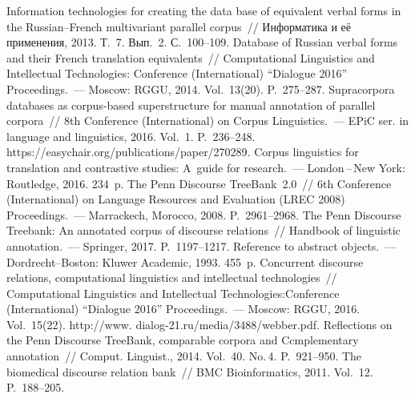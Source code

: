 \begin{multicols}{2}
{\small\frenchspacing
{%
\begin{thebibliography}{99}
Information technologies for creating the data base of equivalent verbal forms in the 
Russian--French multivariant parallel corpus~// Информатика и её применения, 
2013. Т.~7. Вып.~2. С.~100--109.
   Database of Russian verbal forms and their French 
translation equivalents~// Computational Linguistics and Intellectual Technologies:  
Conference (International) ``Dialogue 2016'' Proceedings.~--- Moscow: RGGU, 
2014. Vol.~13(20). P.~275--287.
   Supracorpora databases as corpus-based superstructure for 
manual annotation of parallel corpora~// 8th Conference (International) 
on Corpus Linguistics.~--- EPiC ser. in language and linguistics, 2016. Vol.~1. 
P.~236--248. {\sf https://easychair.org/publications/paper/270289}.
   Corpus linguistics for translation and contrastive 
studies: A~guide for research.~--- London\,--\,New York: Routledge, 2016. 234~p.
   The Penn Discourse TreeBank~2.0~//  6th Conference (International) on 
Language Resources and Evaluation (LREC 2008) Proceedings.~--- Marrackech, 
Morocco, 2008.  P.~2961--2968.
   The Penn Discourse Treebank: An 
annotated corpus of discourse relations~// Handbook of linguistic annotation.~--- 
Springer, 2017. P.~1197--1217.
   Reference to abstract objects.~--- Dordrecht--Boston: Kluwer 
Academic, 1993. 455~p.
   Concurrent discourse relations, computational linguistics and 
intellectual technologies~// Com\-pu\-tational 
Linguistics and Intellectual Technologies:\linebreak Conference (International) ``Dialogue 2016'' 
Pro\-ceed\-ings.~--- Moscow: RGGU, 2016. Vol.~15(22). {\sf 
http://www. dialog-21.ru/media/3488/webber.pdf}.
   Reflections on the Penn Discourse 
TreeBank, comparable corpora and Ccmplementary annotation~// Comput. 
Linguist., 2014. Vol.~40. No.\,4. P.~921--950.
   The biomedical discourse 
relation bank~// BMC Bioinformatics, 2011. Vol.~12. P.~188--205.

\end{thebibliography}}}
\end{multicols}

